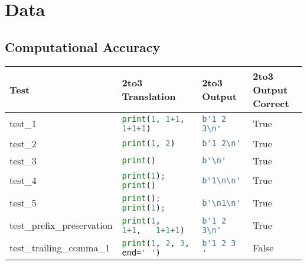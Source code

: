 \section{Data}
\label{appendix:Data}
\subsection{Computational Accuracy}

\begin{table}[h!]
    \centering
    \begin{tabular}{@{}l|lll@{}}
    \toprule
    Test                                  & 2to3 Translation                      & 2to3 Output                            & 2to3 Output Correct \\ \midrule
    test\_1                               & \lstinline[language=Python, style=pythonstyle]|print(1, 1+1, 1+1+1)                 | & \lstinline[language=Python, style=pythonstyle]|b'1 2 3\n'  |            & True                \\
    test\_2                               & \lstinline[language=Python, style=pythonstyle]|print(1, 2)                          | & \lstinline[language=Python, style=pythonstyle]|b'1 2\n'   |             & True                \\
    test\_3                               & \lstinline[language=Python, style=pythonstyle]|print()                              | & \lstinline[language=Python, style=pythonstyle]|b'\n'    |               & True                \\
    test\_4                               & \lstinline[language=Python, style=pythonstyle]|print(1); print()                    | & \lstinline[language=Python, style=pythonstyle]|b'1\n\n' |& True                \\
    test\_5                               & \lstinline[language=Python, style=pythonstyle]|print(); print(1);                   | & \lstinline[language=Python, style=pythonstyle]|b'\n1\n' |& True                \\
    test\_prefix\_preservation            & \lstinline[language=Python, style=pythonstyle]|print(1,   1+1,   1+1+1)             | & \lstinline[language=Python, style=pythonstyle]|b'1 2 3\n'  |            & True                \\
    test\_trailing\_comma\_1              & \lstinline[language=Python, style=pythonstyle]|print(1, 2, 3, end=' ')              | & \lstinline[language=Python, style=pythonstyle]|b'1 2 3 '   |                           & False               \\

\end{tabular}
\end{table}
